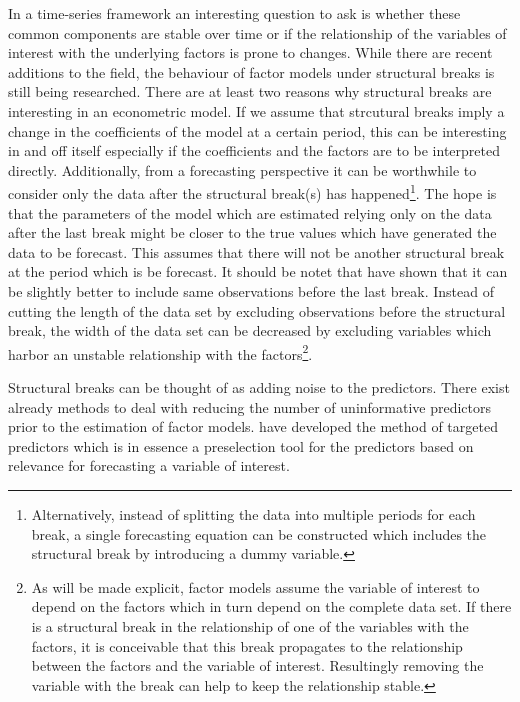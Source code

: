 \documentclass[12pt]{article}
\begin{document}
In a time-series framework an interesting question to ask is whether these common components are stable over time or if the relationship of the variables of interest with the underlying factors is prone to changes. While there are recent additions to the field, the behaviour of factor models under structural breaks is still being researched. There are at least two reasons why structural breaks are interesting in an econometric model. If we assume that strcutural breaks imply a change in the coefficients of the model at a certain period, this can be interesting in and off itself especially if the coefficients and the factors are to be interpreted directly. Additionally, from a forecasting perspective it can be worthwhile to consider only the data after the structural break(s) has happened\footnote{Alternatively, instead of splitting the data into multiple periods for each break, a single forecasting equation can be constructed which includes the structural break by introducing a dummy variable.}. The hope is that the parameters of the model which are estimated relying only on the data after the last break might be closer to the true values which have generated the data to be forecast. This assumes that there will not be another structural break at the period which is be forecast. It should be notet that \citet{pesaran2007selection} have shown that it can be slightly better to include same observations before the last break. Instead of cutting the length of the data set by excluding observations before the structural break, the width of the data set can be decreased by excluding variables which harbor an unstable relationship with the factors\footnote{As will be made explicit, factor models assume the variable of interest to depend on the factors which in turn depend on the complete data set. If there is a structural break in the relationship of one of the variables with the factors, it is conceivable that this break propagates to the relationship between the factors and the variable of interest. Resultingly removing the variable with the break can help to keep the relationship stable.}.

Structural breaks can be thought of as adding noise to the predictors. There exist already methods to deal with reducing the number of uninformative predictors prior to the estimation of factor models. \citet{bai2008forecasting} have developed the method of targeted predictors which is in essence a preselection tool for the predictors based on relevance for forecasting a variable of interest.
\end{document}
